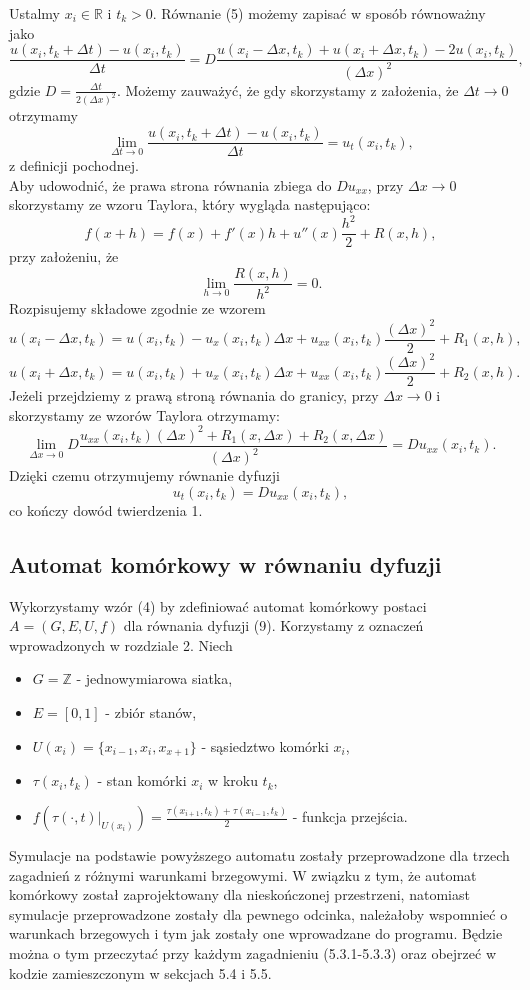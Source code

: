 \documentclass[a4paper,12pt]{article}
\begin{document}
Ustalmy $x_i\in\mathbb{R}$ i $t_k>0$. Równanie (5) możemy zapisać w sposób równoważny jako
$$  \frac{u(x_i,t_k+\Delta t) - u(x_i, t_k)}{\Delta t} = D\frac{u(x_i-\Delta x,t_k) + u(x_i+\Delta x, t_k)-2u(x_i,t_k)}{(\Delta x)^2}, $$
gdzie $D=\frac{\Delta t}{2(\Delta x)^2}.$
Możemy zauważyć, że gdy skorzystamy z założenia, że  $\Delta t \rightarrow 0$ otrzymamy
$$\lim_{\Delta t \rightarrow 0}\frac{u(x_i,t_k+\Delta t) - u(x_i, t_k)}{\Delta t}=u_t(x_i,t_k),$$
z definicji pochodnej.\\
Aby udowodnić, że prawa strona równania zbiega do $Du_{xx}$, przy $\Delta x\rightarrow 0$ skorzystamy ze wzoru Taylora, który wygląda następująco:
$$f(x+h)=f(x)+f'(x)h+u''(x)\frac{h^2}{2}+R(x,h),$$
przy założeniu, że
$$\lim_{h\rightarrow 0}\frac{R(x,h)}{h^2}=0.$$
Rozpisujemy składowe zgodnie ze wzorem
$$u(x_i-\Delta x,t_k) = u(x_i,t_k)-u_x(x_i,t_k)\Delta x+u_{xx}(x_i,t_k)\frac{(\Delta x)^2}{2}+R_1(x,h),$$
$$u(x_i+\Delta x,t_k) = u(x_i,t_k)+u_x(x_i,t_k)\Delta x+u_{xx}(x_i,t_k)\frac{(\Delta x)^2}{2}+R_2(x,h).$$
Jeżeli przejdziemy z prawą stroną równania do granicy, przy $\Delta x\rightarrow0$ i skorzystamy ze wzorów Taylora otrzymamy:
$$\lim_{\Delta x\rightarrow0}D\frac{u_{xx}(x_i,t_k)(\Delta x)^2+R_1(x,\Delta x)+R_2(x,\Delta x)}{(\Delta x)^2}=Du_{xx}(x_i,t_k).$$ 
Dzięki czemu otrzymujemy równanie dyfuzji
\begin{equation}
u_t(x_i,t_k)=Du_{xx}(x_i,t_k),
\end{equation}
co kończy dowód twierdzenia 1.
\subsection{Automat komórkowy w równaniu dyfuzji}

Wykorzystamy wzór (4) by zdefiniować automat komórkowy postaci \\ $A=(G,E,U,f)$ dla równania dyfuzji (9). Korzystamy z oznaczeń wprowadzonych w rozdziale 2. Niech
\begin{itemize}
    \item $G =\mathbb{Z}$ - jednowymiarowa siatka,
    \item $E = [0,1]$ - zbiór stanów,
    \item $U(x_i)= \{x_{i-1}, x_i,x_{x+1}\}$ - sąsiedztwo komórki $x_i$,
    \item $\tau(x_i,t_k)$ - stan komórki $x_i$ w kroku $t_k$,
    \item $f(\tau(\cdot,t)|_{U(x_i)})= \frac{\tau(x_{i + 1}, t_k)+\tau(x_{i-1},t_k) }{2}$ - funkcja przejścia.
\end{itemize}
Symulacje na podstawie powyższego automatu zostały przeprowadzone dla trzech zagadnień z różnymi warunkami brzegowymi. W związku z tym, że automat komórkowy został zaprojektowany dla nieskończonej przestrzeni, natomiast symulacje przeprowadzone zostały dla pewnego odcinka, należałoby wspomnieć o warunkach brzegowych i tym jak zostały one wprowadzane do programu. Będzie można o tym przeczytać przy każdym zagadnieniu (5.3.1-5.3.3) oraz obejrzeć w kodzie zamieszczonym w sekcjach 5.4 i 5.5. 
\end{document}
